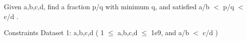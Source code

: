Given a,b,c,d, find a fraction p/q with minimum q, and satisfied a/b $<$ p/q $<$ c/d .  

Constraints
Dataset 1: a,b,c,d ( 1  $\le$  a,b,c,d  $\le$  1e9, and a/b $<$ c/d )
